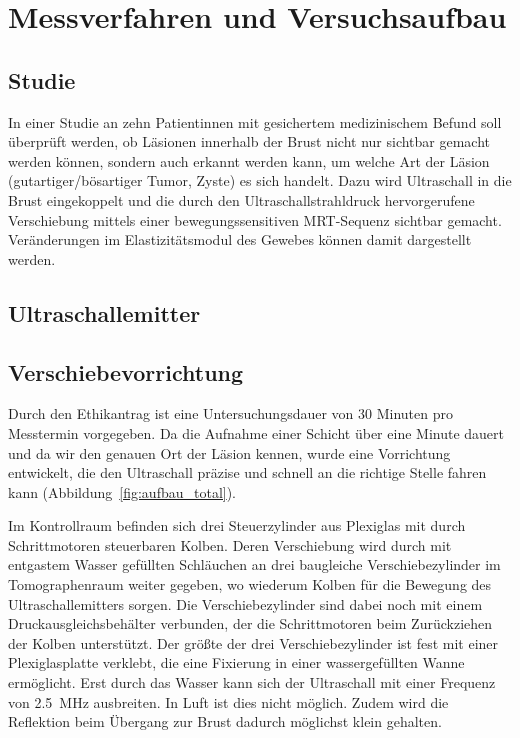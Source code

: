 \documentclass[
    11pt,
    ngerman
]{scrreprt}
\begin{document}
\chapter{Messverfahren und Versuchsaufbau}

\section{Studie}

In einer Studie an zehn Patientinnen mit gesichertem medizinischem Befund soll
überprüft werden, ob Läsionen innerhalb der Brust nicht nur sichtbar gemacht
werden können, sondern auch erkannt werden kann, um welche Art der Läsion
(gutartiger/bösartiger Tumor, Zyste) es sich handelt. Dazu wird Ultraschall in
die Brust eingekoppelt und die durch den Ultraschallstrahldruck hervorgerufene
Verschiebung mittels einer bewegungssensitiven MRT-Sequenz sichtbar gemacht.
Veränderungen im Elastizitätsmodul des Gewebes können damit dargestellt werden.

\section{Ultraschallemitter}

\section{Verschiebevorrichtung}

Durch den Ethikantrag ist eine Untersuchungsdauer von 30 Minuten pro Messtermin
vorgegeben. Da die Aufnahme einer Schicht über eine Minute dauert und da wir
den genauen Ort der Läsion kennen, wurde eine Vorrichtung entwickelt, die den
Ultraschall präzise und schnell an die richtige Stelle fahren kann
(Abbildung~\ref{fig:aufbau_total}).

Im Kontrollraum befinden sich drei Steuerzylinder aus Plexiglas mit durch
Schrittmotoren steuerbaren Kolben. Deren Verschiebung wird durch mit
entgastem Wasser gefüllten Schläuchen an drei baugleiche Verschiebezylinder im
Tomographenraum weiter gegeben, wo wiederum Kolben für die Bewegung des
Ultraschallemitters sorgen. Die Verschiebezylinder sind dabei noch mit einem
Druckausgleichsbehälter verbunden, der die Schrittmotoren beim Zurückziehen der
Kolben unterstützt. Der größte der drei Verschiebezylinder ist fest mit einer
Plexiglasplatte verklebt, die eine Fixierung in einer wassergefüllten Wanne
ermöglicht. Erst durch das Wasser kann sich der Ultraschall mit einer Frequenz
von \SI{2.5}{\mega\hertz} ausbreiten. In Luft ist dies nicht möglich. Zudem wird
die Reflektion beim Übergang zur Brust dadurch möglichst klein gehalten.
\end{document}

